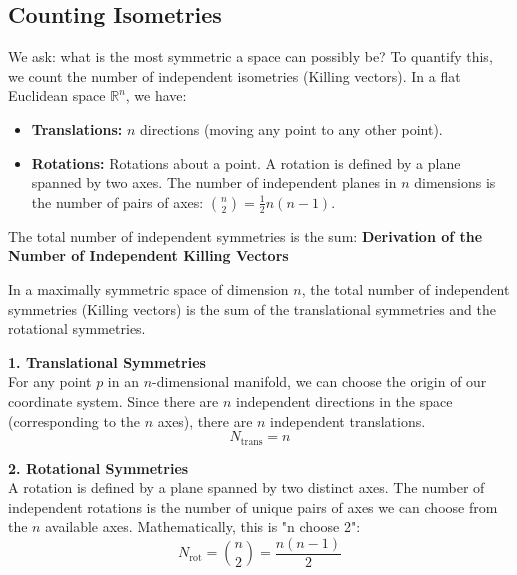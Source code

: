 \documentclass[11pt, a4paper]{report}
\begin{document}
\subsection*{Counting Isometries}
We ask: what is the most symmetric a space can possibly be? To quantify this, we count the number of independent isometries (Killing vectors).
In a flat Euclidean space $\mathbb{R}^n$, we have:
\begin{itemize}
    \item \textbf{Translations:} $n$ directions (moving any point to any other point).
    \item \textbf{Rotations:} Rotations about a point. A rotation is defined by a plane spanned by two axes. The number of independent planes in $n$ dimensions is the number of pairs of axes: $\binom{n}{2} = \frac{1}{2}n(n-1)$.
\end{itemize}
The total number of independent symmetries is the sum:
\noindent \textbf{Derivation of the Number of Independent Killing Vectors}

\vspace{1em}

In a maximally symmetric space of dimension $n$, the total number of independent symmetries (Killing vectors) is the sum of the translational symmetries and the rotational symmetries.

\vspace{1em}

\noindent \textbf{1. Translational Symmetries} \\
For any point $p$ in an $n$-dimensional manifold, we can choose the origin of our coordinate system. Since there are $n$ independent directions in the space (corresponding to the $n$ axes), there are $n$ independent translations.
\begin{equation}
    N_{\text{trans}} = n
\end{equation}

\vspace{1em}

\noindent \textbf{2. Rotational Symmetries} \\
A rotation is defined by a plane spanned by two distinct axes. The number of independent rotations is the number of unique pairs of axes we can choose from the $n$ available axes. Mathematically, this is "n choose 2":
\begin{equation}
    N_{\text{rot}} = \binom{n}{2} = \frac{n(n-1)}{2}
\end{equation}

\vspace{1em}
\end{document}
